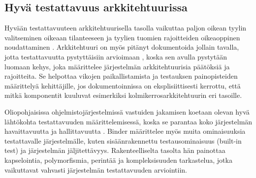\documentclass[finnish]{tktltiki2}
\theoremstyle{definition}
\theoremstyle{remark}
\begin{document}



 

\subsection{Hyvä testattavuus arkkitehtuurissa}



Hyvään testattavuuteen arkkitehtuurisella tasolla vaikuttaa paljon oikean tyylin valitseminen oikeaan tilanteeseen ja tyylien tuomien rajoitteiden oikeaoppinen noudattaminen \citep[s. 66]{Eickelmann:1996:MOS:243327.243602}. Arkkitehtuuri on myös pitänyt dokumentoida jollain tavalla, jotta testattavuutta pystyttäisiin arvioimaan \citep[s. 6]{mari_impact_2003}, koska sen avulla pystytään luomaan kehys, joka määrittelee järjestelmän arkkitehtuurisia päätöksiä ja rajoitteita. Se helpottaa vikojen paikallistamista ja testauksen painopisteiden määrittelyä kehittäjille, jos dokumentoinnissa on eksplisiittisesti kerrottu, että mitkä komponentit kuuluvat esimerkiksi kolmikerrosarkkitehtuurin eri tasoille. 

Oliopohjaisissa ohjelmistojärjestelmissä vastuiden jakamisen koetaan olevan hyvä lähtökohta testattavuuden määrittelemisessä, koska se parantaa koko järjestelmän havaittavuutta ja hallittavuutta \citep{Binder:1994:DTO:182987.184077}. Binder määrittelee myös muita ominaisuuksia testattavalle järjestelmälle, kuten sisäänrakennettu testausominaisuus (built-in test) ja järjestelmän jäljitettävyys. Rakenteelliselta tasolta hän painottaa kapselointia, polymorfismia, perintää ja kompleksisuuden tarkastelua, jotka vaikuttavat vahvasti järjestelmän testattavuuden arviointiin.
\end{document}
